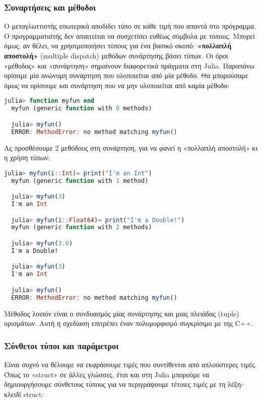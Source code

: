   \subsubsection{Συναρτήσεις και μέθοδοι}

  Ο μεταγλωττιστής εσωτερικά αποδίδει τύπο σε κάθε τιμή που απαντά στο πρόγραμμα.
  Ο προγραμματιστής δεν απαιτείται να συσχετίσει ευθέως σύμβολα με τύπους.
  Μπορεί όμως, αν θέλει, να χρησιμοποιήσει τύπους για ένα βασικό σκοπό:
  \textbf{«πολλαπλή αποστολή»} (multiple dispatch) μεθόδων συνάρτησης βάσει τύπων.
  Οι όροι «μέθοδος» και «συνάρτηση» σημαίνουν διαφορετικά πράγματα στη Julia. Παραπάνω ορίσαμε μία ανώνυμη συνάρτηση που υλοποιείται από μία μέθοδο.
  Θα μπορούσαμε όμως να ορίσουμε και συνάρτηση που να μην υλοποιείται από καμία μέθοδο:
  \begin{lstlisting}[language=julia]
  julia> function myfun end
  myfun (generic function with 0 methods)

  julia> myfun()
  ERROR: MethodError: no method matching myfun()
  \end{lstlisting}

  Ας προσθέσουμε 2 μεθόδους στη συνάρτηση, για να φανεί η «πολλαπλή αποστολή» κι η χρήση τύπων:
  \begin{lstlisting}[language=julia]
  julia> myfun(i::Int)= print("I'm an Int")
  myfun (generic function with 1 method)

  julia> myfun(3)
  I'm an Int

  julia> myfun(i::Float64)= print("I'm a Double!")
  myfun (generic function with 2 methods)

  julia> myfun(3.0)
  I'm a Double!

  julia> myfun(3)
  I'm an Int

  julia> myfun()
  ERROR: MethodError: no method matching myfun()
  \end{lstlisting}

  Μέθοδος λοιπόν είναι ο συνδυασμός μίας συνάρτησης και μιας πλειάδας (tuple) ορισμάτων.
  Αυτή η σχεδίαση επιτρέπει έναν πολυμορφισμό συγκρίσιμο με της C++.

  \subsubsection{Σύνθετοι τύποι και παράμετροι} \label{intro:julia_struct}

  Είναι συχνό να θέλουμε να εκφράσουμε τιμές που συντίθενται από απλούστερες τιμές.
  Όπως το «struct» σε άλλες γλώσσες, έτσι και στη Julia μπορούμε να δημιουργήσουμε σύνθετους τύπους για να περιγράψουμε τέτοιες τιμές με τη λέξη-κλειδί struct:

